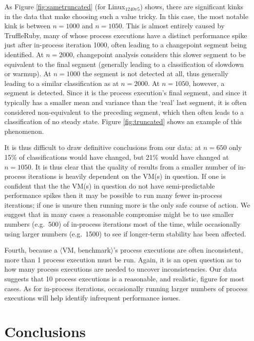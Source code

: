 \documentclass[acmsmall]{acmart}\settopmatter{printfolios=true}
\newcommand{\bencherseven}{Linux$_\mathrm{1240v5}$\xspace}
\newcommand{\vmbpair}{$\langle$VM, benchmark$\rangle$\xspace}
\begin{document}
As Figure \ref{fig:sametruncated} (for \bencherseven) shows, there are significant
kinks in the data that make choosing such a value tricky. In this case, the most
notable kink is between $n=1000$ and $n=1050$. This is almost entirely caused by
TruffleRuby, many of whose process executions have a distinct performance spike
just after in-process iteration 1000, often leading to a changepoint
segment being identified. At $n=2000$, changepoint analysis considers this slower
segment to be equivalent to the final segment (generally leading to a classification
of slowdown or warmup). At $n=1000$ the segment is not detected at all, thus generally
leading to a similar classification as at $n=2000$. At $n=1050$, however, a
segment is detected. Since it is the process execution's final segment,
and since it typically has a smaller mean and variance than the `real' last
segment, it is often considered non-equivalent to the preceding segment,
which then often leads to a classification of no steady state.
Figure \ref{fig:truncated} shows an example of this phenomenon.

It is thus difficult to draw definitive conclusions from our data:
at $n=650$ only 15\% of classifications would have changed,
but 21\% would have changed at $n=1050$.
It is thus clear that the quality of results from a smaller
number of in-process iterations is heavily dependent on the VM(s) in question.
If one is confident that the the VM(s) in question do not have
semi-predictable performance spikes then it may be possible to run many fewer
in-process iterations; if one is unsure then running more is the only safe
course of action. We suggest that in many cases a reasonable compromise might be to
use smaller numbers (e.g.~500) of in-process iterations most
of the time, while occasionally using larger numbers (e.g.~1500) to see if
longer-term stability has been affected.

Fourth, because a \vmbpair's process executions are often inconsistent, more
than 1 process execution must be run. Again, it is an open question as to how
many process executions are needed to uncover inconsistencies. Our data suggests that
10 process executions is a reasonable, and realistic, figure for most
cases. As for in-process iterations, occasionally running larger numbers of
process executions will help identify infrequent performance issues.


\section{Conclusions}
\label{sec:conclusions}
\end{document}
